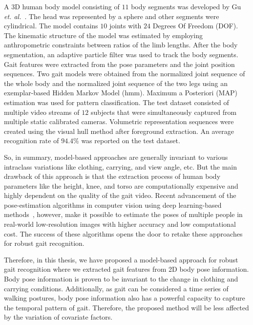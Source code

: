 A 3D human body model consisting of $11$ body segments was developed by Gu \textit{et. al.}~\cite{Gu_10}. The head was represented by a sphere and other segments were cylindrical. The model contains $10$ joints with $24$ Degrees Of Freedom (DOF). The kinematic structure of the model was estimated by employing anthropometric constraints between ratios of the limb lengths. After the body segmentation, an adaptive particle filter was used to track the body segments. Gait features were extracted from the pose parameters and the joint position sequences. Two gait models were obtained from the normalized joint sequence of the whole body and the normalized joint sequence of the two legs using an exemplar-based Hidden Markov Model (\gls{hmm}). Maximum a Posteriori (MAP) estimation was used for pattern classification. The test dataset consisted of multiple video streams of $12$ subjects that were simultaneously captured from multiple static calibrated cameras. Volumetric representation sequences were created using the visual hull method after foreground extraction. An average recognition rate of $94.4\% $ was reported on the test dataset.

So, in summary, model-based approaches are generally invariant to various intraclass variations like clothing, carrying, and view angle, etc. But the main drawback of this approach is that the extraction process of human body parameters like the height, knee, and torso are computationally expensive and highly dependent on the quality of the gait video. Recent advancement of the pose-estimation algorithms in computer vision using deep learning-based methods~\cite{Cao_19, Wei_16}, however, make it possible to estimate the poses of multiple people in real-world low-resolution images with higher accuracy and low computational cost. The success of these algorithms opens the door to retake these approaches for robust gait recognition. 

Therefore, in this thesis, we have proposed a model-based approach for robust gait recognition where we extracted gait features from 2D body pose information. Body pose information is proven to be invariant to the change in clothing and carrying conditions. Additionally, as gait can be considered a time series of walking postures, body pose information also has a powerful capacity to capture the temporal pattern of gait. Therefore, the proposed method will be less affected by the variation of covariate factors. 




